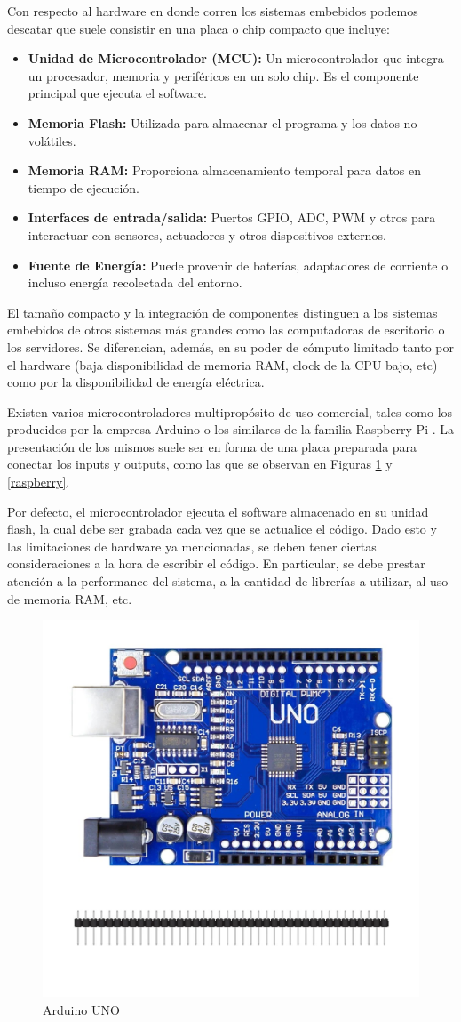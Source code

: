 Con respecto al hardware en donde corren los sistemas embebidos podemos descatar que suele consistir en una placa o chip compacto que incluye:
\begin{itemize}
    \item \textbf{Unidad de Microcontrolador (MCU):} Un microcontrolador que integra un procesador, memoria y perif\'ericos en un solo chip. Es el componente principal que ejecuta el software.
    \item \textbf{Memoria Flash:} Utilizada para almacenar el programa y los datos no vol\'atiles.
    \item \textbf{Memoria RAM:} Proporciona almacenamiento temporal para datos en tiempo de ejecuci\'on.
    \item \textbf{Interfaces de entrada/salida:} Puertos \gls{GPIO}, \gls{ADC}, \gls{PWM} y otros para interactuar con sensores, actuadores y otros dispositivos externos.
    \item \textbf{Fuente de Energ\'ia:} Puede provenir de bater\'ias, adaptadores de corriente o incluso energ\'ia recolectada del entorno.
\end{itemize}
El tama\~no compacto y la integraci\'on de componentes distinguen a los sistemas embebidos de otros sistemas m\'as grandes como las computadoras de escritorio o los servidores. Se diferencian, además, en su poder de cómputo limitado tanto por el hardware (baja disponibilidad de memoria RAM, \gls{clock} de la CPU bajo, etc) como por la disponibilidad de energía eléctrica.

Existen varios microcontroladores multipropósito de uso comercial, tales como los producidos por la empresa Arduino \cite{arduinoMicro} o los similares de la familia  Raspberry Pi \cite{raspMicro}. La presentación de los mismos suele ser en forma de una placa preparada para conectar los inputs y outputs, como las que se observan en Figuras \ref{arduinoUNO} y \ref{raspberry}.

Por defecto, el microcontrolador ejecuta el software almacenado en su unidad flash, la cual debe ser grabada cada vez que se actualice el código. Dado esto y las limitaciones de hardware ya mencionadas, se deben tener ciertas consideraciones a la hora de escribir el código. En particular, se debe prestar atención a la performance del sistema, a la cantidad de librerías a utilizar, al uso de memoria RAM, etc.

\begin{figure}[h!]
	\caption{Arduino UNO}
	\label{arduinoUNO}
	\centering
    \includegraphics[width=0.5\linewidth]{arduinoUNO.jpeg}
\end{figure}


